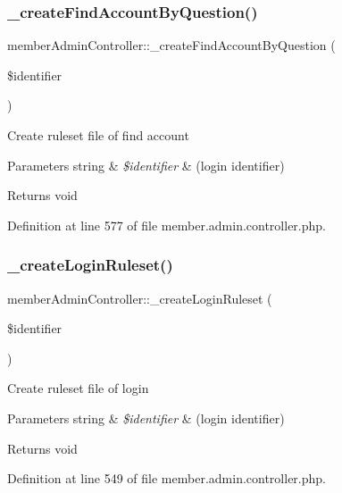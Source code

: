 \subsubsection{\texorpdfstring{\+\_\+create\+Find\+Account\+By\+Question()}{\_createFindAccountByQuestion()}}
{\footnotesize\ttfamily member\+Admin\+Controller\+::\+\_\+create\+Find\+Account\+By\+Question (\begin{DoxyParamCaption}\item[{}]{\$identifier }\end{DoxyParamCaption})}

Create ruleset file of find account 
\begin{DoxyParams}[1]{Parameters}
string & {\em \$identifier} & (login identifier) \\
\hline
\end{DoxyParams}
\begin{DoxyReturn}{Returns}
void 
\end{DoxyReturn}


Definition at line 577 of file member.\+admin.\+controller.\+php.

\mbox{\label{classmemberAdminController_ad9823f9a79e8a26a39d912bcd888e301}} 
\subsubsection{\texorpdfstring{\+\_\+create\+Login\+Ruleset()}{\_createLoginRuleset()}}
{\footnotesize\ttfamily member\+Admin\+Controller\+::\+\_\+create\+Login\+Ruleset (\begin{DoxyParamCaption}\item[{}]{\$identifier }\end{DoxyParamCaption})}

Create ruleset file of login 
\begin{DoxyParams}[1]{Parameters}
string & {\em \$identifier} & (login identifier) \\
\hline
\end{DoxyParams}
\begin{DoxyReturn}{Returns}
void 
\end{DoxyReturn}


Definition at line 549 of file member.\+admin.\+controller.\+php.

